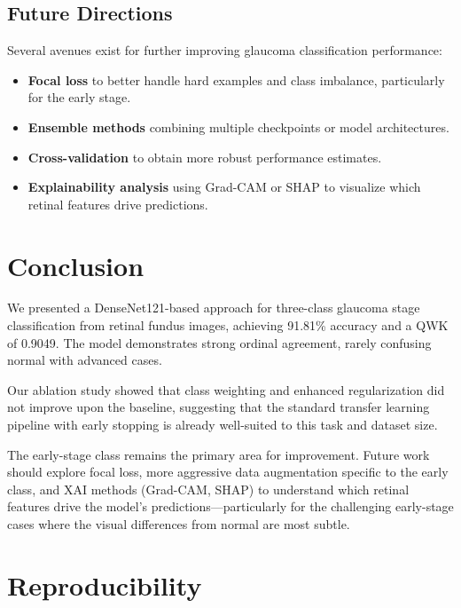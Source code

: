 \documentclass[conference]{IEEEtran}
\begin{document}
\subsection{Future Directions}

Several avenues exist for further improving glaucoma classification performance:

\begin{itemize}
    \item \textbf{Focal loss} to better handle hard examples and class imbalance, particularly for the early stage.
    \item \textbf{Ensemble methods} combining multiple checkpoints or model architectures.
    \item \textbf{Cross-validation} to obtain more robust performance estimates.
    \item \textbf{Explainability analysis} using Grad-CAM or SHAP to visualize which retinal features drive predictions.
\end{itemize}

\section{Conclusion}
\label{sec:conclusion}

We presented a DenseNet121-based approach for three-class glaucoma stage classification from retinal fundus images, achieving 91.81\% accuracy and a QWK of 0.9049.
The model demonstrates strong ordinal agreement, rarely confusing normal with advanced cases.

Our ablation study showed that class weighting and enhanced regularization did not improve upon the baseline, suggesting that the standard transfer learning pipeline with early stopping is already well-suited to this task and dataset size.

The early-stage class remains the primary area for improvement.
Future work should explore focal loss, more aggressive data augmentation specific to the early class, and XAI methods (Grad-CAM, SHAP) to understand which retinal features drive the model's predictions---particularly for the challenging early-stage cases where the visual differences from normal are most subtle.

\section*{Reproducibility}
\end{document}
